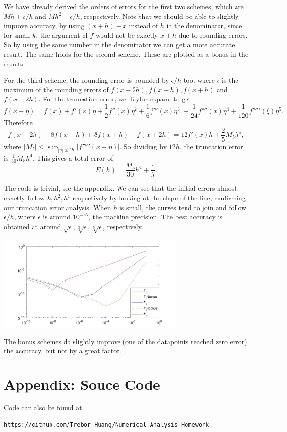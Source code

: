 \documentclass{homework}
\begin{document}
\begin{problem} We have already derived the orders of errors for the first two schemes, which are \(Mh + \epsilon/h\) and \(Mh^2 + \epsilon/h\), respectively. Note that we should be able to slightly improve accuracy, by using \((x+h)-x\) instead of \(h\) in the denominator, since for small \(h\), the argument of \(f\) would not be exactly \(x+h\) due to rounding errors. So by using the same number in the denominator we can get a more accurate result. The same holds for the second scheme. These are plotted as a bonus in the results.

For the third scheme, the rounding error is bounded by \(\epsilon/h\) too, where \(\epsilon\) is the maximum of the rounding errors of \(f(x-2h), f(x-h),f(x+h)\) and \(f(x+2h)\). For the truncation error, we Taylor expand to get
\[f(x+\eta) = f(x) + f'(x) \eta + \frac12f''(x)\eta^2 + \frac16 f'''(x)\eta^3. + \frac1{24}f''''(x)\eta^4 + \frac1{120} f'''''(\xi)\eta^5.\]
Therefore
\[f(x-2h) -8f(x-h) + 8f(x+h) - f(x+2h)
=12 f'(x)h + \frac{2}{5}M_5 h^5,\]
where \(|M_5| \le \sup_{|\eta| \le 2h} |f'''''(x+\eta)|\). So dividing by \(12h\), the truncation error is \(\frac{1}{30} M_5 h^4\). This gives a total error of \[E(h) = \frac{M_5}{30}h^4 + \frac{\epsilon}{h}.\]

The code is trivial, see the appendix. We can see that the initial errors almost exactly follow \(h, h^2, h^4\) respectively by looking at the slope of the line, confirming our truncation error analysis. When \(h\) is small, the curves tend to join and follow \(\epsilon/h\), where \(\epsilon\) is around \(10^{-16}\), the machine precision. The best accuracy is obtained at around \(\sqrt\epsilon, \sqrt[3]\epsilon, \sqrt[5]\epsilon\), respectively.
\begin{center}
\includegraphics[width=0.7\textwidth]{Hw6-Fig2.jpg}
\end{center}
The bonus schemes do slightly improve (one of the datapoints reached zero error) the accuracy, but not by a great factor.
\end{problem}

\newpage
\section*{Appendix: Souce Code}
Code can also be found at 
\begin{center}
\texttt{https://github.com/Trebor-Huang/Numerical-Analysis-Homework}
\end{center}

\end{document}
